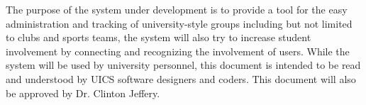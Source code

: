 The purpose of the system under development is to provide a tool
		for the easy administration and tracking of university-style groups
		including but not limited to clubs and sports teams, the system will
		also try to increase student involvement by connecting and recognizing
		the involvement of users. While the system will be used by university
		personnel, this document is intended to be read and understood by UICS
		software designers and coders.  This document will also be approved by
		Dr. Clinton Jeffery.